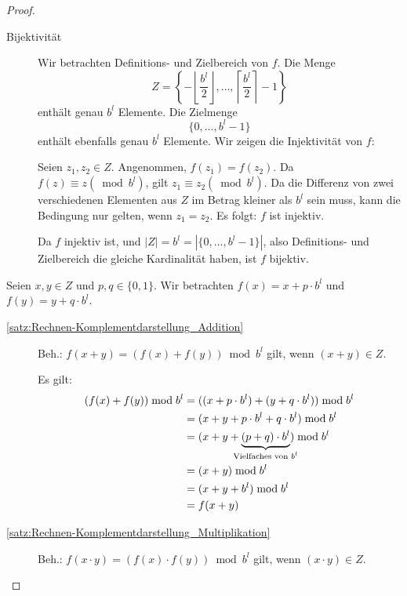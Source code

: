 \documentclass{article}
\begin{document}
    \begin{proof}
      \begin{description}
        \item[Bijektivität] Wir betrachten Definitions- und Zielbereich von $f$.
          Die Menge \[Z = \left\{ - \left\lfloor \displaystyle\frac{b^l}{2} \right\rfloor , \dots, \left\lceil \displaystyle\frac{b^l}{2} \right\rceil -1 \right\}\] enthält genau $b^l$ Elemente.
          Die Zielmenge \[\{0,\dots,b^l-1\}\] enthält ebenfalls genau $b^l$ Elemente.
          Wir zeigen die Injektivität von $f$: 

          Seien $z_1, z_2 \in Z$. Angenommen, $f(z_1) = f(z_2)$.
          Da $f(z) \equiv z (\bmod b^l)$, gilt $z_1 \equiv z_2 (\bmod b^l)$.
          Da die Differenz von zwei verschiedenen Elementen aus $Z$ im Betrag kleiner als $b^l$ sein muss, kann die Bedingung nur gelten, wenn $z_1 = z_2$.
          Es folgt: $f$ ist injektiv.

          \noindent Da $f$ injektiv ist, und $|Z| = b^l = |\{0,\dots,b^l-1\}|$, also Definitions- und Zielbereich die gleiche Kardinalität haben, ist $f$ bijektiv.
      \end{description}

      \vspace{\baselineskip}

      Seien $x,y \in Z$ und $p,q \in \{0,1\}$. 
      Wir betrachten $f(x)=x + p\cdot b^l$ und $f(y)=y + q \cdot b^l$.
      
      \begin{description}
        \item[\ref{satz:Rechnen-Komplementdarstellung_Addition}] Beh.: $f(x+y) = (f(x)+f(y)) \bmod b^l$ gilt, wenn $(x+y) \in Z$. 
          
          Es gilt:
          \begin{align*}
            (f(x)+f(y)) \bmod {b^l} &= ((x+p\cdot b^l) + (y+q\cdot b^l)) \bmod {b^l} \\
            &= (x+y+p \cdot b^l + q \cdot b^l) \bmod {b^l} \\
            &= (x+y+ \underbrace{(p+q)\cdot b^l}_{\mathclap{\text{Vielfaches von }b^l}}) \bmod {b^l} \\
            &= (x+y) \bmod {b^l} \\
            &= (x+y+b^l) \bmod {b^l} \\
            &= f(x+y)
          \end{align*}

        \item[\ref{satz:Rechnen-Komplementdarstellung_Multiplikation}] Beh.: $f(x \cdot y) = (f(x) \cdot f(y)) \bmod b^l$ gilt, wenn $(x\cdot y) \in Z$.
          

\end{description}
\end{proof}
\end{document}
